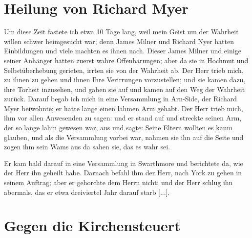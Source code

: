 \section{Heilung von Richard Myer}

Um diese Zeit fastete 
ich etwa 10 Tage lang, weil mein
Geist um der Wahrheit willen schwer heimgesucht war; denn
James Milner und Richard 
Nyer hatten Einbildungen 
und viele
machten es ihnen nach. Dieser James Milner und einige seiner
Anhänger hatten zuerst wahre 
Offenbarungen; aber da sie in
Hochmut und Selbstüberhebung gerieten, irrten sie von der
Wahrheit ab. Der Herr trieb mich, zu ihnen zu gehen und ihnen
Ihre Verirrungen vorzustellen; und sie kamen dazu, ihre Torheit
inzusehen, und gaben sie auf und kamen auf den Weg der
Wahrheit zurück. Darauf 
begab ich mich in eine Versammlung
in Arn-Side, der Richard Myer beiwohnte; 
er hatte lange einen
lahmen Arm gehabt. Der Herr trieb mich, ihm vor allen 
Anwesenden zu sagen:  und er stand auf und streckte
seinen Arm, der so lange lahm gewesen war, aus und sagte:
 Seine
Eltern wollten es kaum glauben, und als die Versammlung
vorbei war, nahmen sie ihn auf die Seite und zogen ihm sein
Wams aus da sahen sie, das es wahr sei.

Er kam bald darauf
in eine Versammlung in Swarthmore und 
berichtete da, wie
der Herr ihn geheilt habe. Darnach befahl ihm der Herr, nach
York zu gehen in seinem Auftrag; aber er gehorchte dem Herrn
nicht; und der Herr schlug ihn abermals, das er etwa dreiviertel
Jahr darauf starb [...].

\section{Gegen die Kirchensteuert}

